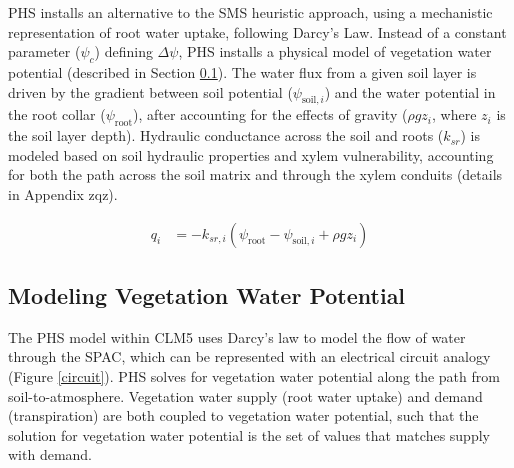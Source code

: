 \documentclass[draft,linenumbers]{agujournal}
\begin{document}
    PHS installs an alternative to the SMS heuristic approach, using a mechanistic representation of root water uptake, following Darcy's Law.
    Instead of a constant parameter ($\psi_c$) defining $\Delta\psi$, PHS installs a physical model of vegetation water potential (described in Section \ref{sect:vwp}).
    The water flux from a given soil layer is driven by the gradient between soil potential ($\psi_{\text{soil},i}$) and the water potential in the root collar ($\psi_{\text{root}}$), 
    after accounting for the effects of gravity ($\rho g z_i$, where $z_i$ is the soil layer depth).
    Hydraulic conductance across the soil and roots ($k_{sr}$) is modeled based on soil hydraulic properties and xylem vulnerability, 
    accounting for both the path across the soil matrix and through the xylem conduits (details in Appendix zqz).
    
    \begin{linenomath*}
    \begin{equation}
        \begin{aligned}
    q_i &= -k_{sr,i}  \left(\psi_{\text{root}}-\psi_{\text{soil},i}+\rho g z_i\right)
    \label{phs:sink}
    \end{aligned}
    \end{equation}
    \end{linenomath*}
    
\subsection{Modeling Vegetation Water Potential}
\label{sect:vwp}
  The PHS model within CLM5 uses Darcy's law to model the flow of water through the SPAC, which can be represented with an electrical circuit analogy (Figure \ref{circuit}).
  PHS solves for vegetation water potential along the path from soil-to-atmosphere.
  Vegetation water supply (root water uptake) and demand (transpiration) are both coupled to vegetation water potential, 
  such that the solution for vegetation water potential is the set of values that matches supply with demand.
\end{document}
